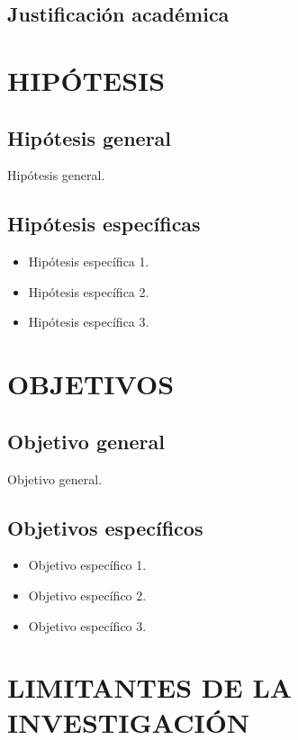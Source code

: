 \subsection{Justificación académica}

\lipsum[5]

\section{HIPÓTESIS}

\subsection{Hipótesis general}

Hipótesis general.

\subsection{Hipótesis específicas}

\begin{itemize}
  \item Hipótesis específica 1.
  \item Hipótesis específica 2.
  \item Hipótesis específica 3.
\end{itemize}

\section{OBJETIVOS}

\subsection{Objetivo general}

Objetivo general.

\subsection{Objetivos específicos}

\begin{itemize}
  \item Objetivo específico 1.
  \item Objetivo específico 2.
  \item Objetivo específico 3.
\end{itemize}

\section{LIMITANTES DE LA INVESTIGACIÓN}

